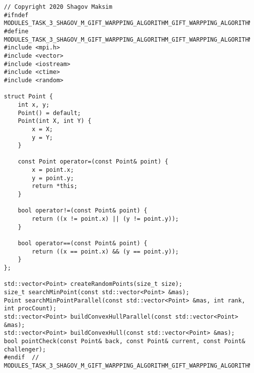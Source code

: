 \documentclass{report}
\begin{document}
\begin{lstlisting}
// Copyright 2020 Shagov Maksim
#ifndef MODULES_TASK_3_SHAGOV_M_GIFT_WARPPING_ALGORITHM_GIFT_WARPPING_ALGORITHM_H_
#define MODULES_TASK_3_SHAGOV_M_GIFT_WARPPING_ALGORITHM_GIFT_WARPPING_ALGORITHM_H_
#include <mpi.h>
#include <vector>
#include <iostream>
#include <ctime>
#include <random>

struct Point {
    int x, y;
    Point() = default;
    Point(int X, int Y) {
        x = X;
        y = Y;
    }

    const Point operator=(const Point& point) {
        x = point.x;
        y = point.y;
        return *this;
    }

    bool operator!=(const Point& point) {
        return ((x != point.x) || (y != point.y));
    }

    bool operator==(const Point& point) {
        return ((x == point.x) && (y == point.y));
    }
};

std::vector<Point> createRandomPoints(size_t size);
size_t searchMinPoint(const std::vector<Point> &mas);
Point searchMinPointParallel(const std::vector<Point> &mas, int rank, int procCount);
std::vector<Point> buildConvexHullParallel(const std::vector<Point> &mas);
std::vector<Point> buildConvexHull(const std::vector<Point> &mas);
bool pointCheck(const Point& back, const Point& current, const Point& challenger);
#endif  // MODULES_TASK_3_SHAGOV_M_GIFT_WARPPING_ALGORITHM_GIFT_WARPPING_ALGORITHM_H_
\end{lstlisting}
\end{document}
